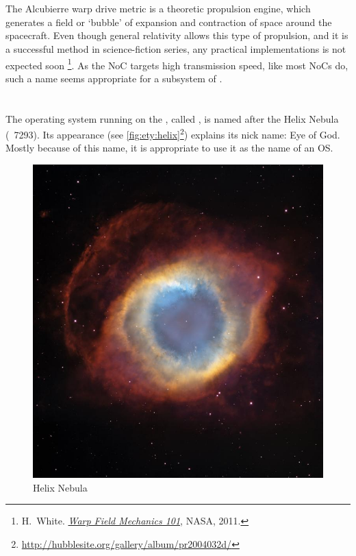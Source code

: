 \section{\Warpfield}

The Alcubierre warp drive metric is a theoretic propulsion engine, which generates a field or `bubble' of expansion and contraction of space around the spacecraft.
Even though general relativity allows this type of propulsion, and it is a successful method in science-fiction series, any practical implementations is not expected soon%
\footnote{H.\ White. \href{http://ntrs.nasa.gov/archive/nasa/casi.ntrs.nasa.gov/20110015936_2011016932.pdf}{\textit{Warp Field Mechanics 101}}, NASA, 2011.}.
As the \Warpfield* \ac{NoC} targets high transmission speed, like most \acp{NoC} do, such a name seems appropriate for a subsystem of \Starburst.


\section{\Helix}

The operating system running on the \MicroBlazes, called \Helix*, is named after the Helix Nebula (~7293).
Its appearance (see \vref{fig:ety:helix}\footnote{\url{http://hubblesite.org/gallery/album/pr2004032d/}}) explains its nick name: Eye of God.
Mostly because of this name, it is appropriate to use it as the name of an \ac{OS}.

\begin{figure}%
\includegraphics[width=.7\linewidth]{figures/ety_helix}%
\caption{Helix Nebula}%
\label{fig:ety:helix}%
\end{figure}


